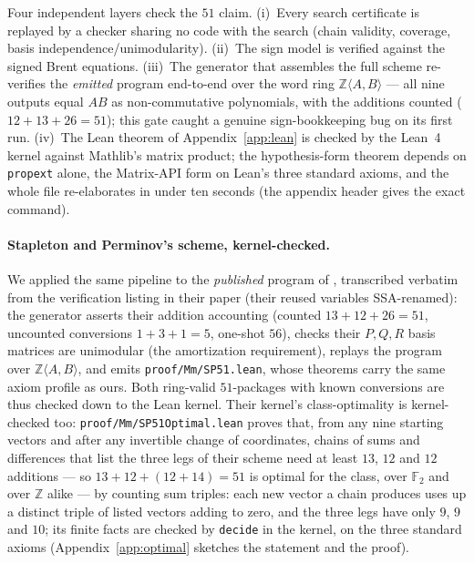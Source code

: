 \documentclass[11pt]{article}
\theoremstyle{definition}
\theoremstyle{remark}
\newcommand{\F}{\mathbb{F}}
\newcommand{\Z}{\mathbb{Z}}
\begin{document}
Four independent layers check the $51$ claim.  (i)~Every search
certificate is replayed by a checker sharing no code with the search
(chain validity, coverage, basis independence/unimodularity).
(ii)~The sign model is verified against the signed Brent equations.
(iii)~The generator that assembles the full scheme re-verifies the
\emph{emitted} program end-to-end over the word ring
$\Z\langle A,B\rangle$ --- all nine outputs equal $AB$ as
non-commutative polynomials, with the additions counted
($12+13+26=51$); this gate caught a genuine sign-bookkeeping bug on
its first run.  (iv)~The Lean theorem of Appendix~\ref{app:lean} is
checked by the Lean~4 kernel against Mathlib's matrix product; the
hypothesis-form theorem depends on \texttt{propext} alone, the
Matrix-API form on Lean's three standard axioms, and the whole file
re-elaborates in under ten seconds (the appendix header gives the
exact command).

\paragraph{Stapleton and Perminov's scheme, kernel-checked.}
We applied the same pipeline to the \emph{published} program of
\cite{SP26}, transcribed verbatim from the verification listing in
their paper (their reused variables SSA-renamed): the generator
asserts their addition accounting (counted $13+12+26=51$, uncounted
conversions $1+3+1=5$, one-shot $56$), checks their $P,Q,R$ basis
matrices are unimodular (the amortization requirement), replays the
program over $\Z\langle A,B\rangle$, and emits
\texttt{proof/Mm/SP51.lean}, whose theorems carry the same axiom
profile as ours.  Both ring-valid $51$-packages with known
conversions are thus checked down to the Lean kernel.  Their kernel's
class-optimality is kernel-checked too: \texttt{proof/Mm/SP51Optimal.lean}
proves that, from any nine starting vectors and after any invertible
change of coordinates, chains of sums and differences that list the
three legs of their scheme need at least $13$, $12$ and $12$ additions
--- so $13+12+(12+14)=51$ is optimal for the class, over $\F_2$ and
over $\Z$ alike --- by counting sum triples: each new vector a chain
produces uses up a distinct triple of listed vectors adding to zero,
and the three legs have only $9$, $9$ and $10$; its finite facts are
checked by \texttt{decide} in the kernel, on the three standard axioms
(Appendix~\ref{app:optimal} sketches the statement and the proof).
\end{document}

